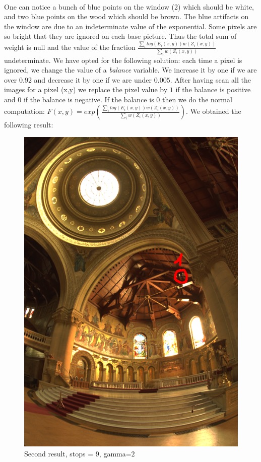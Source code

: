 \documentclass[a4paper,12pt,oneside,final]{report}
\begin{document}
\paragraph{}
One can notice a bunch of blue points on the window (2) which should be white, and two blue points on the wood which should be brown. The blue artifacts on the window are due to an indeterminate value of the exponential. Some pixels are so bright that they are ignored on each base picture. Thus the total sum of weight is null and the value of the fraction $\frac{\sum_ilog(E_i(x,y))w(Z_i(x,y))}{\sum_iw(Z_i(x,y))}$ undeterminate. We have opted for the following solution: each time a pixel is ignored, we change the value of a \textit{balance} variable. We increase it by one if we are over $0.92$ and decrease it by one if we are under $0.005$. After having scan all the images for a pixel (x,y) we replace the pixel value by $1$ if the balance is positive and $0$ if the balance is negative. If the balance is $0$ then we do the normal computation: $F(x,y)=exp\left(\frac{\sum_ilog(E_i(x,y))w(Z_i(x,y))}{\sum_iw(Z_i(x,y))}\right)$. We obtained the following result:
\begin{figure}[!h]
\centering
\includegraphics[scale=0.5]{pictures/raw2_res.png}
\caption{Second result, stops = $9$, gamma=$2$}
\label{img:res_raw2}
\end{figure}
\cleardoublepage
\end{document}
